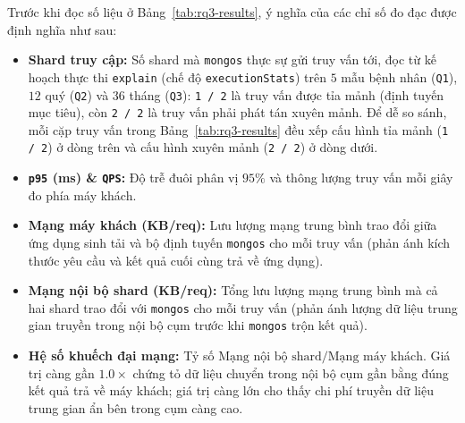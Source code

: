 Trước khi đọc số liệu ở Bảng~\ref{tab:rq3-results}, ý nghĩa của các chỉ số đo đạc được định nghĩa như sau:
\begin{itemize}[leftmargin=0.8cm, itemsep=2pt]
  \item \textbf{Shard truy cập:} Số shard mà \texttt{mongos} thực sự gửi truy vấn tới, đọc từ kế hoạch thực thi \texttt{explain} (chế độ \texttt{executionStats}) trên $5$ mẫu bệnh nhân (\texttt{Q1}), $12$ quý (\texttt{Q2}) và $36$ tháng (\texttt{Q3}): \texttt{1 / 2} là truy vấn được tỉa mảnh (định tuyến mục tiêu), còn \texttt{2 / 2} là truy vấn phải phát tán xuyên mảnh. Để dễ so sánh, mỗi cặp truy vấn trong Bảng~\ref{tab:rq3-results} đều xếp cấu hình tỉa mảnh (\texttt{1 / 2}) ở dòng trên và cấu hình xuyên mảnh (\texttt{2 / 2}) ở dòng dưới.
  \item \textbf{\texttt{p95} (ms) \& \texttt{QPS}:} Độ trễ đuôi phân vị $95\%$ và thông lượng truy vấn mỗi giây đo phía máy khách.
  \item \textbf{Mạng máy khách (KB/req):} Lưu lượng mạng trung bình trao đổi giữa ứng dụng sinh tải và bộ định tuyến \texttt{mongos} cho mỗi truy vấn (phản ánh kích thước yêu cầu và kết quả cuối cùng trả về ứng dụng).
  \item \textbf{Mạng nội bộ shard (KB/req):} Tổng lưu lượng mạng trung bình mà cả hai shard trao đổi với \texttt{mongos} cho mỗi truy vấn (phản ánh lượng dữ liệu trung gian truyền trong nội bộ cụm trước khi \texttt{mongos} trộn kết quả).
  \item \textbf{Hệ số khuếch đại mạng:} Tỷ số $\text{Mạng nội bộ shard} / \text{Mạng máy khách}$. Giá trị càng gần $1.0\times$ chứng tỏ dữ liệu chuyển trong nội bộ cụm gần bằng đúng kết quả trả về máy khách; giá trị càng lớn cho thấy chi phí truyền dữ liệu trung gian ẩn bên trong cụm càng cao.
\end{itemize}


